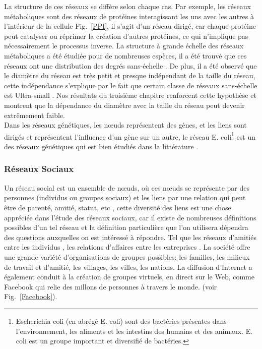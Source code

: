 La structure de ces réseaux se diffère selon chaque cas. Par exemple, les réseaux métaboliques sont des réseaux
de protéines interagissant les uns avec les autres à l'intérieur de la cellule Fig.~\ref{PPI}, il s'agit d'un réseau
dirigé, car chaque protéine peut catalyser ou réprimer la création d'autres protéines, ce qui n'implique pas 
nécessairement le processus inverse. La structure à grande échelle des réseaux métaboliques a été étudiée pour
de nombreuses espèces, il a été trouvé que ces réseaux ont une distribution des degrés sans-échelle \cite{Je-al2000}.
De plus, il a été observé que le diamètre du réseau est très petit et presque indépendant de la taille du réseau, 
cette indépendance s'explique par le fait que certain classe de réseaux sans-échelle est Ultra-small
\cite{Cohen-Havlin2003,Do-al2003,ChL2003}. Nos résultats du troisième chapitre renforcent 
cette hypothèse et montrent que la dépendance du diamètre avec la taille du réseau peut devenir extrêmement faible.\\
Dans les réseaux génétiques, les nœuds représentent des gènes, et les liens sont dirigés  et représentent
l'influence d'un gène sur un autre, le réseau E. coli\footnote{Escherichia coli (en abrégé E. coli) sont des
	bactéries présentes dans l'environnement, les aliments et les intestins des humains et des animaux. E. coli est 
	un groupe important et diversifié de bactéries.} est un des réseaux génétiques qui est bien étudiés dans la 
littérature \cite{Mi-al2002}.


\subsubsection{Réseaux Sociaux}
Un réseau social est un ensemble de nœuds, où ces nœuds se représente par des  personnes  (individus ou groupes sociaux)
et les liens par une relation qui peut être de parenté, amitié, statut, etc \cite{JS2000}, cette diversité des liens
est une chose appréciée dans l'étude des réseaux sociaux, car il existe de nombreuses définitions possibles d'un tel 
réseau et la définition particulière que l'on utilisera dépendra des questions auxquelles on est intéressé à répondre.
Tel que les réseaux d'amitiés entre les individus \cite{WW1977,Mo1934}, les relations d'affaires entre les entreprises
\cite{JP1977}.
La société offre une grande variété d'organisations de groupes possibles: les familles, les milieux de travail et
d'amitié, les villages, les villes, les nations. La diffusion d'Internet a également conduit à la création de
groupes virtuels, en direct sur le Web, comme Facebook qui relie des millons de personnes à travers le monde.
(voir Fig.~\ref{Facebook}).

